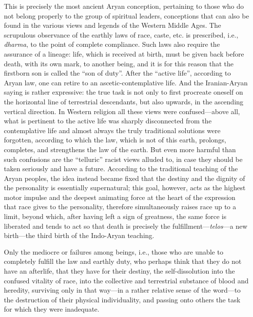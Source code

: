 This is precisely the most ancient Aryan conception, pertaining to those who do not belong properly to the group of spiritual leaders, conceptions that can also be found in the various views and legends of the Western Middle Ages. The scrupulous observance of the earthly laws of race, caste, etc. is prescribed, i.e., \emph{dharma}, to the point of complete compliance. Such laws also require the assurance of a lineage: life, which is received at birth, must be given back before death, with its own mark, to another being, and it is for this reason that the firstborn son is called the ``son of duty''. After the ``active life'', according to Aryan law, one can retire to an ascetic-contemplative life. And the Iranian-Aryan saying is rather expressive: the true task is not only to first procreate oneself on the horizontal line of terrestrial descendants, but also upwards, in the ascending vertical direction. In Western religion all these views were confused---above all, what is pertinent to the active life was sharply disconnected from the contemplative life and almost always the truly traditional solutions were forgotten, according to which the law, which is not of this earth, prolongs, completes, and strengthens the law of the earth. But even more harmful than such confusions are the ``telluric'' racist views alluded to, in case they should be taken seriously and have a future. According to the traditional teaching of the Aryan peoples, the idea instead became fixed that the destiny and the dignity of the personality is essentially supernatural; this goal, however, acts as the highest motor impulse and the deepest animating force at the heart of the expression that race gives to the personality, therefore simultaneously raises race up to a limit, beyond which, after having left a sign of greatness, the same force is liberated and tends to act so that death is precisely the fulfillment---\emph{telos}---a new birth---the third birth of the Indo-Aryan teaching.

Only the mediocre or failures among beings, i.e., those who are unable to completely fulfill the law and earthly duty, who perhaps think that they do not have an afterlife, that they have for their destiny, the self-dissolution into the confused vitality of race, into the collective and terrestrial substance of blood and heredity, surviving only in that way---in a rather relative sense of the word---to the destruction of their physical individuality, and passing onto others the task for which they were inadequate.



